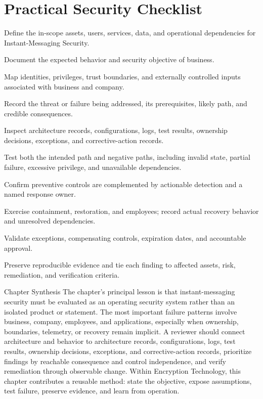 \documentclass[11pt,letterpaper]{article}
\begin{document}
\section*{Practical Security Checklist}
\begin{CornellChecklist}
\item Define the in-scope assets, users, services, data, and operational dependencies for Instant-Messaging Security.
\item Document the expected behavior and security objective of business.
\item Map identities, privileges, trust boundaries, and externally controlled inputs associated with business and company.
\item Record the threat or failure being addressed, its prerequisites, likely path, and credible consequences.
\item Inspect architecture records, configurations, logs, test results, ownership decisions, exceptions, and corrective-action records.
\item Test both the intended path and negative paths, including invalid state, partial failure, excessive privilege, and unavailable dependencies.
\item Confirm preventive controls are complemented by actionable detection and a named response owner.
\item Exercise containment, restoration, and employees; record actual recovery behavior and unresolved dependencies.
\item Validate exceptions, compensating controls, expiration dates, and accountable approval.
\item Preserve reproducible evidence and tie each finding to affected assets, risk, remediation, and verification criteria.
\end{CornellChecklist}
\begin{CornellSummaryBox}{Chapter Synthesis}
The chapter's principal lesson is that instant-messaging security must be evaluated as an operating security system rather than an isolated product or statement. The most important failure patterns involve business, company, employees, and applications, especially when ownership, boundaries, telemetry, or recovery remain implicit. A reviewer should connect architecture and behavior to architecture records, configurations, logs, test results, ownership decisions, exceptions, and corrective-action records, prioritize findings by reachable consequence and control independence, and verify remediation through observable change. Within Encryption Technology, this chapter contributes a reusable method: state the objective, expose assumptions, test failure, preserve evidence, and learn from operation.
\end{CornellSummaryBox}
\end{document}
